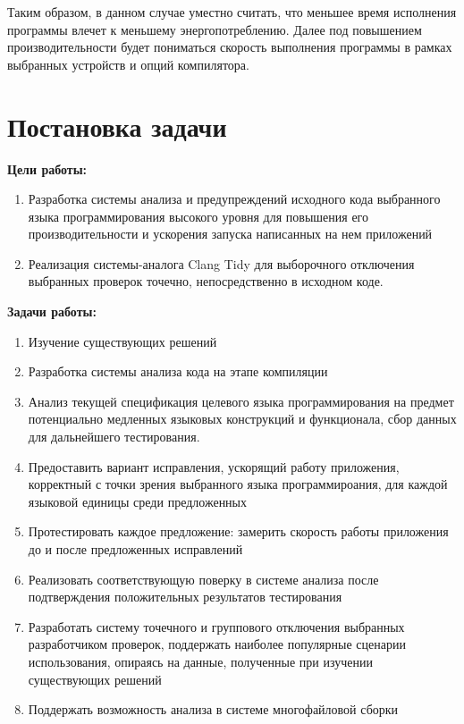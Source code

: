 \documentclass{mipt-thesis-bs}
\begin{document}
Таким образом, в данном случае уместно считать, что меньшее время исполнения программы
влечет к меньшему энергопотреблению. Далее под повышением производительности будет пониматься скорость выполнения
программы в рамках выбранных устройств и опций компилятора.
\chapter{Постановка задачи}

\textbf{Цели работы:}

\begin{enumerate}
    \item Разработка системы анализа и предупреждений исходного кода выбранного языка программирования высокого уровня 
для повышения его производительности и ускорения запуска написанных на нем приложений
    \item Реализация системы-аналога Clang Tidy для выборочного отключения выбранных проверок точечно, непосредственно в исходном коде.
\end{enumerate}

\textbf{Задачи работы:}

\begin{enumerate}
    \item Изучение существующих решений
    \item Разработка системы анализа кода на этапе компиляции
    \item Анализ текущей спецификация целевого языка программирования на предмет потенциально медленных языковых конструкций и функционала, 
    сбор данных для дальнейшего тестирования.
    \item Предоставить вариант исправления, ускорящий работу приложения, корректный с точки 
    зрения выбранного языка программироания, для каждой языковой единицы среди предложенных
    \item Протестировать каждое предложение: замерить скорость работы приложения до и после предложенных исправлений
    \item Реализовать соответствующую поверку в системе анализа после подтверждения положительных результатов тестирования
    \item Разработать систему точечного и группового отключения выбранных разработчиком проверок, поддержать наиболее популярные сценарии 
    использования, опираясь на данные, полученные при изучении существующих решений
    \item Поддержать возможность анализа в системе многофайловой сборки

\end{enumerate}
\end{document}
